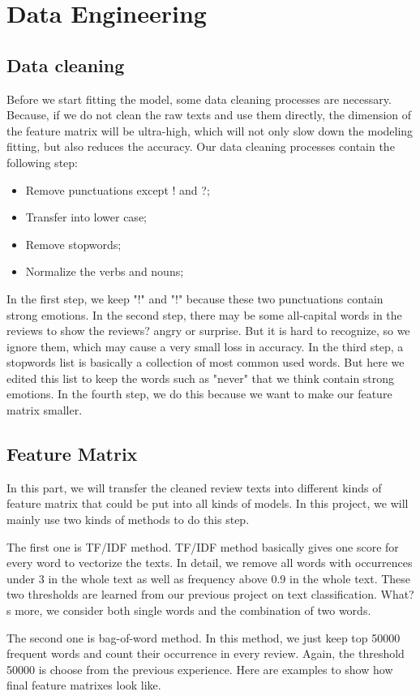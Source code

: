 \documentclass[letterpaper]{article} %
\begin{document}
\section{Data Engineering}
\subsection{Data cleaning}
Before we start fitting the model, some data cleaning processes are necessary. Because, if we do not clean the raw texts and use them directly, the dimension of the feature matrix will be ultra-high, which will not only slow down the modeling fitting, but also reduces the accuracy. 
Our data cleaning processes contain the following step:
\begin{itemize}
\item Remove punctuations except ! and ?;
\item Transfer into lower case;
\item Remove stopwords;
\item Normalize the verbs and nouns;
\end{itemize}
In the first step, we keep "!" and "!" because these two punctuations contain strong emotions. In the second step, there may be some all-capital words in the reviews to show the reviews? angry or surprise. But it is hard to recognize, so we ignore them, which may cause a very small loss in accuracy. In the third step, a stopwords list is basically a collection of most common used words. But here we edited this list to keep the words such as "never" that we think contain strong emotions. In the fourth step, we do this because we want to make our feature matrix smaller.
\subsection{Feature Matrix}
In this part, we will transfer the cleaned review texts into different kinds of feature matrix that could be put into all kinds of models. In this project, we will mainly use two kinds of methods to do this step. \par
The first one is TF/IDF method. TF/IDF method basically gives one score for every word to vectorize the texts. In detail, we remove all words with occurrences under 3 in the whole text as well as frequency above 0.9 in the whole text. These two thresholds are learned from our previous project on text classification. What?s more, we consider both single words and the combination of two words.\par
The second one is bag-of-word method. In this method, we just keep top 50000 frequent words and count their occurrence in every review. Again, the threshold 50000 is choose from the previous experience. Here are examples to show how final feature matrixes look like.
\end{document}

